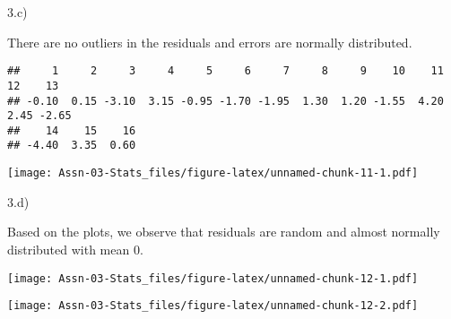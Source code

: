 \documentclass[
]{article}
\newenvironment{Shaded}{\begin{snugshade}}{\end{snugshade}}
\newcommand{\FloatTok}[1]{\textcolor[rgb]{0.00,0.00,0.81}{#1}}
\newcommand{\FunctionTok}[1]{\textcolor[rgb]{0.00,0.00,0.00}{#1}}
\newcommand{\NormalTok}[1]{#1}
\newcommand{\OtherTok}[1]{\textcolor[rgb]{0.56,0.35,0.01}{#1}}
\newcommand{\SpecialCharTok}[1]{\textcolor[rgb]{0.00,0.00,0.00}{#1}}
\begin{document}
3.c)

There are no outliers in the residuals and errors are normally
distributed.

\begin{Shaded}
\end{Shaded}

\begin{verbatim}
##     1     2     3     4     5     6     7     8     9    10    11    12    13 
## -0.10  0.15 -3.10  3.15 -0.95 -1.70 -1.95  1.30  1.20 -1.55  4.20  2.45 -2.65 
##    14    15    16 
## -4.40  3.35  0.60
\end{verbatim}

\begin{Shaded}
\end{Shaded}

\texttt{[image: Assn-03-Stats\_files/figure-latex/unnamed-chunk-11-1.pdf]}

3.d)

Based on the plots, we observe that residuals are random and almost
normally distributed with mean 0.

\begin{Shaded}
\end{Shaded}

\texttt{[image: Assn-03-Stats\_files/figure-latex/unnamed-chunk-12-1.pdf]}

\begin{Shaded}
\end{Shaded}

\texttt{[image: Assn-03-Stats\_files/figure-latex/unnamed-chunk-12-2.pdf]}
\end{document}
